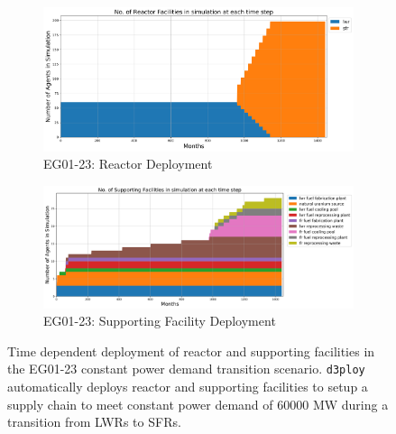 \documentclass[11pt]{article}
\newcommand{\deploy}{\texttt{d3ploy}\xspace}%
\begin{document}
\begin{figure}[]
	\centering
	\begin{subfigure}[t]{1.2\textwidth}
		\centering
		\includegraphics[width=\linewidth]{23-figures/eg23-stack_reactor.png} 
		\caption{EG01-23: Reactor Deployment}
		\label{fig:23reactor}
	\end{subfigure}
	\vspace{1cm}
	\begin{subfigure}[t]{1.2\textwidth}
		\centering
		\includegraphics[width=\linewidth]{23-figures/eg23-stack_support.png} 
		\caption{EG01-23: Supporting Facility Deployment}
		\label{fig:23support}
	\end{subfigure}
	\hfill
	\caption{Time dependent deployment of reactor and supporting facilities in 
	the EG01-23 constant power demand transition scenario. 
	\deploy automatically deploys reactor and supporting facilities 
	to setup a supply chain to meet constant power demand of $60000$ MW
	during a transition from \glspl{LWR} to \glspl{SFR}. }
	\label{fig:23stack}
\end{figure}
\end{document}
